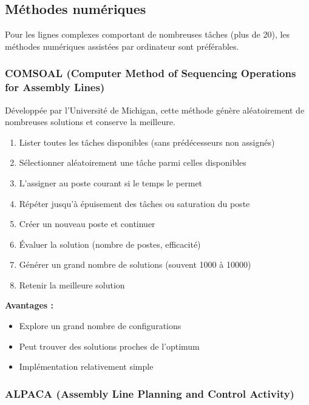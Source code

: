 \documentclass[12pt,a4paper]{article}
\newenvironment{methodbox}[1]
  {\begin{tcolorbox}[colback=blue!5!white, colframe=methodcolor, title=#1]\small}
  {\end{tcolorbox}}
\begin{document}
\subsection{Méthodes numériques}

Pour les lignes complexes comportant de nombreuses tâches (plus de 20), les méthodes numériques assistées par ordinateur sont préférables.

\subsubsection{COMSOAL (Computer Method of Sequencing Operations for Assembly Lines)}

Développée par l'Université de Michigan, cette méthode génère aléatoirement de nombreuses solutions et conserve la meilleure.

\begin{methodbox}{Principe de COMSOAL}
\begin{enumerate}
    \item Lister toutes les tâches disponibles (sans prédécesseurs non assignés)
    \item Sélectionner aléatoirement une tâche parmi celles disponibles
    \item L'assigner au poste courant si le temps le permet
    \item Répéter jusqu'à épuisement des tâches ou saturation du poste
    \item Créer un nouveau poste et continuer
    \item Évaluer la solution (nombre de postes, efficacité)
    \item Générer un grand nombre de solutions (souvent 1000 à 10000)
    \item Retenir la meilleure solution
\end{enumerate}
\end{methodbox}

\textbf{Avantages :}
\begin{itemize}
    \item Explore un grand nombre de configurations
    \item Peut trouver des solutions proches de l'optimum
    \item Implémentation relativement simple
\end{itemize}

\subsubsection{ALPACA (Assembly Line Planning and Control Activity)}
\end{document}
